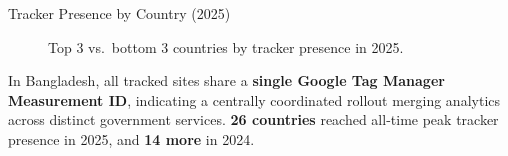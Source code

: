   \begin{block}{Tracker Presence by Country (2025)}

    \begin{figure}
      \centering
      \caption{Top 3 vs.\ bottom 3 countries by tracker presence in 2025.}
    \end{figure}

    In Bangladesh, all tracked sites share a \textbf{single Google Tag Manager Measurement ID}, indicating a centrally coordinated rollout merging analytics across distinct government services. \textbf{26 countries} reached all-time peak tracker presence in 2025, and \textbf{14 more} in 2024.

  \end{block}
